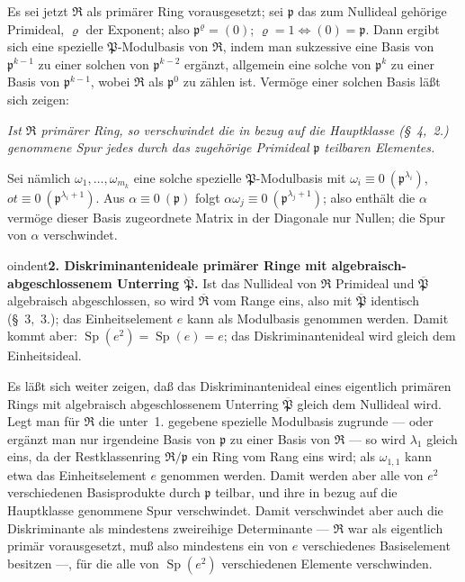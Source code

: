 \documentclass[12pt,a4paper]{article}
\newcommand{\mf}[1]{\mathfrak{#1}}     %
\newcommand{\idealp}{\mathfrak{p}}
\newcommand{\PP}{\mathfrak{P}}          %
\DeclareMathOperator{\Sp}{Sp}           %
\theoremstyle{definition}
\begin{document}
Es sei jetzt $\mf{R}$ als prim\"arer Ring vorausgesetzt; sei $\idealp$ das
zum Nullideal geh\"orige Primideal, $\varrho$ der Exponent; also
$\idealp^\varrho = (0)$; $\varrho = 1 \Leftrightarrow (0) = \idealp$. Dann ergibt
sich eine spezielle $\PP$-Modulbasis von $\mf{R}$, indem man sukzessive eine
Basis von $\idealp^{k-1}$ zu einer solchen von $\idealp^{k-2}$ erg\"anzt,
allgemein eine solche von $\idealp^k$ zu einer Basis von $\idealp^{k-1}$,
wobei $\mf{R}$ als $\idealp^0$ zu z\"ahlen ist. Verm\"oge einer solchen Basis
l\"a\ss t sich zeigen:

\textit{Ist $\mf{R}$ prim\"arer Ring, so verschwindet die in bezug auf die
Hauptklasse (\S~4,~2.) genommene Spur jedes durch das zugeh\"orige Primideal
$\idealp$ teilbaren Elementes.}

Sei n\"amlich $\omega_1,\dots,\omega_{m_k}$ eine solche spezielle
$\PP$-Modulbasis mit $\omega_i \equiv 0\ (\idealp^{\lambda_i})$,
$ ot\equiv 0\ (\idealp^{\lambda_i+1})$. Aus $\alpha \equiv 0\ (\idealp)$
folgt $\alpha\omega_j \equiv 0\ (\idealp^{\lambda_j+1})$; also enth\"alt die
$\alpha$ verm\"oge dieser Basis zugeordnete Matrix in der Diagonale nur
Nullen; die Spur von $\alpha$ verschwindet.

\medskip



oindent\textbf{2. Diskriminantenideale prim\"arer Ringe mit
algebraisch-abgeschlossenem Unterring $\overline{\PP}$.} Ist das Nullideal
von $\mf{R}$ Primideal und $\overline{\PP}$ algebraisch abgeschlossen, so wird
$\overline{\mf{R}}$ vom Range eins, also mit $\overline{\PP}$ identisch
(\S~3,~3.); das Einheitselement $e$ kann als Modulbasis genommen werden.
Damit kommt aber: $\Sp(e^2) = \Sp(e) = e$; das Diskriminantenideal wird
gleich dem Einheitsideal.

Es l\"a\ss t sich weiter zeigen, da\ss{} das Diskriminantenideal eines
eigentlich prim\"aren Rings mit algebraisch abgeschlossenem Unterring
$\overline{\PP}$ gleich dem Nullideal wird. Legt man f\"ur $\mf{R}$ die unter~1. gegebene spezielle Modulbasis zugrunde --- oder erg\"anzt man nur
irgendeine Basis von $\idealp$ zu einer Basis von $\mf{R}$ --- so wird
$\lambda_1$ gleich eins, da der Restklassenring $\mf{R}/\idealp$ ein Ring
vom Rang eins wird; als $\omega_{1,1}$ kann etwa das Einheitselement $e$
genommen werden. Damit werden aber alle von $e^2$ verschiedenen
Basisprodukte durch $\idealp$ teilbar, und ihre in bezug auf die
Hauptklasse genommene Spur verschwindet. Damit verschwindet aber auch die
Diskriminante als mindestens zweireihige Determinante --- $\mf{R}$ war als
eigentlich prim\"ar vorausgesetzt, mu\ss{} also mindestens ein von $e$
verschiedenes Basiselement besitzen ---, f\"ur die alle von
$\Sp(e^2)$ verschiedenen Elemente verschwinden.
\end{document}
